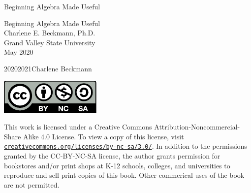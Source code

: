 \documentclass[oneside,10pt,]{book}
\newcommand{\titlepagefont}{\relax}
\numberwithin{equation}{chapter}
\begin{document}
\raggedbottom
\frontmatter
\thispagestyle{empty}
{\titlepagefont\centering
\vspace*{0.28\textheight}
{\Huge Beginning Algebra Made Useful}\\}
\clearpage
\thispagestyle{empty}
{\titlepagefont\centering
\vspace*{0.14\textheight}
{\Huge Beginning Algebra Made Useful}\\[3\baselineskip]
{\Large Charlene E. Beckmann, Ph.D.}\\[0.5\baselineskip]
{\Large Grand Valley State University}\\[3\baselineskip]
{\Large May 2020}\\}
\clearpage
\thispagestyle{empty}
\hypertarget{g:colophon:idp1706617752}{}
\noindent\textcopyright{}2020\textendash{}2021\quad{}Charlene Beckmann\\[0.5\baselineskip]
\begin{image}{0.425}{0.15}{0.425}%
\includegraphics[width=\linewidth]{external/license.pdf}
\end{image}%
 This work is licensed under a Creative Commons Attribution-Noncommercial-Share Alike 4.0 License. To view a copy of this license, visit \href{https://creativecommons.org/licenses/by-nc-sa/3.0/}{\nolinkurl{creativecommons.org/licenses/by-nc-sa/3.0/}}. In addition to the permissions granted by the CC-BY-NC-SA license, the author grants permission for bookstores and\slash{}or print shops at K-12 schools, colleges, and universities to reproduce and sell print copies of this book. Other commerical uses of the book are not permitted.\par\medskip
{}
\end{document}
